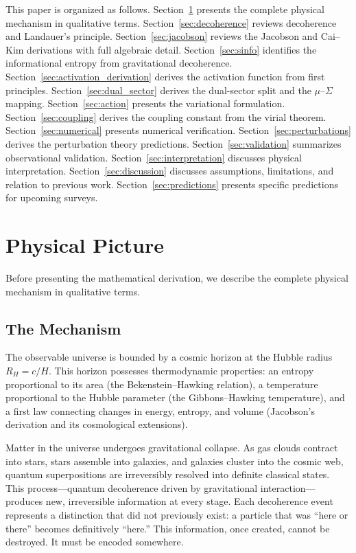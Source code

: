 \documentclass[11pt]{article}
\begin{document}
This paper is organized as follows.
Section~\ref{sec:physical_picture} presents the complete physical mechanism in
qualitative terms.
Section~\ref{sec:decoherence} reviews
decoherence and Landauer's principle.  Section~\ref{sec:jacobson} reviews
the Jacobson and Cai--Kim derivations with full algebraic detail.
Section~\ref{sec:sinfo} identifies the informational entropy from
gravitational decoherence.
Section~\ref{sec:activation_derivation} derives the activation function
from first principles.
Section~\ref{sec:dual_sector} derives the dual-sector split and the
$\mu$--$\Sigma$ mapping.
Section~\ref{sec:action} presents the variational formulation.
Section~\ref{sec:coupling} derives the coupling constant from the virial theorem.
Section~\ref{sec:numerical} presents numerical verification.
Section~\ref{sec:perturbations} derives the perturbation theory predictions.
Section~\ref{sec:validation} summarizes observational validation.
Section~\ref{sec:interpretation} discusses physical interpretation.
Section~\ref{sec:discussion} discusses assumptions, limitations, and
relation to previous work.
Section~\ref{sec:predictions} presents specific predictions for upcoming surveys.


\section{Physical Picture}
\label{sec:physical_picture}

Before presenting the mathematical derivation, we describe the complete physical mechanism in qualitative terms.

\subsection{The Mechanism}

The observable universe is bounded by a cosmic horizon at the Hubble radius $R_H = c/H$. This horizon possesses thermodynamic properties: an entropy proportional to its area (the Bekenstein--Hawking relation), a temperature proportional to the Hubble parameter (the Gibbons--Hawking temperature), and a first law connecting changes in energy, entropy, and volume (Jacobson's derivation and its cosmological extensions).

Matter in the universe undergoes gravitational collapse. As gas clouds contract into stars, stars assemble into galaxies, and galaxies cluster into the cosmic web, quantum superpositions are irreversibly resolved into definite classical states. This process---quantum decoherence driven by gravitational interaction---produces new, irreversible information at every stage. Each decoherence event represents a distinction that did not previously exist: a particle that was ``here or there'' becomes definitively ``here.'' This information, once created, cannot be destroyed. It must be encoded somewhere.
\end{document}
